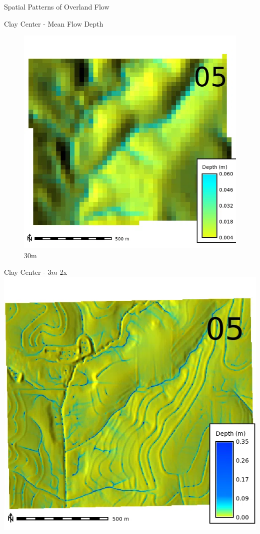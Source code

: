 \documentclass[
  ignorenonframetext,
]{beamer}
\begin{document}
\begin{frame}{Spatial Patterns of Overland Flow}
\begin{block}{Clay Center - Mean Flow Depth}
\begin{figure}[H]
{\centering \includegraphics{../output/clay-center/sensitivity_1/clay-center_depth_30_4_s_average.webp}

}

\caption{30m}

\end{figure}%
\end{block}

\begin{block}{Clay Center - \(3m\) 2x}
\label{clay-center---3m-2x}
\includegraphics{../output/clay-center/sensitivity_1/clay-center_depth_3_2_s_average.webp}
\end{block}


\end{frame}
\end{document}
